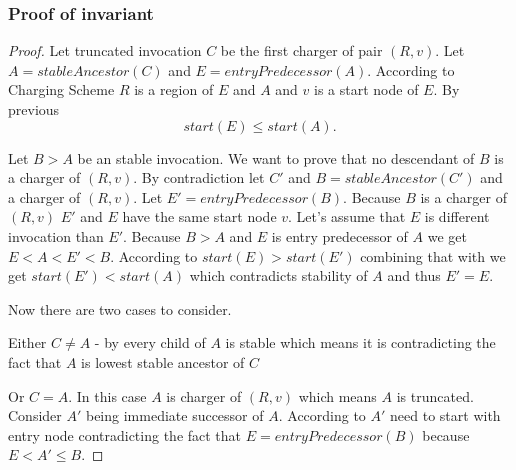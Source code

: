 \subsubsection{Proof of invariant }
\begin{proof}
Let truncated invocation $C$ be the first charger of pair $(R,v)$. Let $A = stableAncestor(C)$ and $E = entryPredecessor(A)$. According to Charging Scheme $R$ is a region of $E$ and $A$ and $v$ is a start node of $E$. By previous 
\begin{equation}
    \label{nice}
    start(E) \leq start(A).
\end{equation}

Let $B > A$ be an stable invocation. We want to prove that no descendant of $B$ is a charger of $(R,v)$. By contradiction let $C'$ and $B = stableAncestor(C')$ and a charger of $(R,v)$. Let $E' = entryPredecessor(B)$. Because $B$ is a charger of $(R,v)$ $E'$ and $E$ have the same start node $v$. Let's assume that $E$ is different invocation than $E'$. Because $B > A$ and $E$ is entry predecessor of $A$ we get $E < A < E' < B$. According to  $start(E) > start(E')$ combining that with  we get $start(E') < start(A)$ which contradicts stability of $A$ and thus $E' = E$.

Now there are two cases to consider.

    Either $C \neq A$ - by  every child of $A$ is stable which means it is contradicting the fact that $A$ is lowest stable ancestor of $C$ 
    
    Or $C = A$. In this case $A$ is charger of $(R,v)$ which means $A$ is truncated. Consider $A'$ being immediate successor of $A$. According to  $A'$ need to start with entry node contradicting the fact that $E = entryPredecessor(B)$ because $E < A' \leq B$.
\end{proof}
